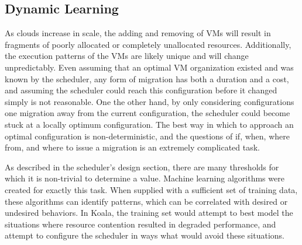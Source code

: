 %
%
%
\subsection{Dynamic Learning}
As clouds increase in scale, the adding and removing of VMs will result in fragments of poorly allocated or completely unallocated resources.  Additionally, the execution patterns of the VMs are likely unique and will change unpredictably.  Even assuming that an optimal VM organization existed and was known by the scheduler, any form of migration has both a duration and a cost, and assuming the scheduler could reach this configuration before it changed simply is not reasonable.  One the other hand, by only considering configurations one migration away from the current configuration, the scheduler could become stuck at a locally optimum configuration.  The best way in which to approach an optimal configuration is non-deterministic, and the questions of if, when, where from, and where to issue a migration is an extremely complicated task.  

As described in the scheduler's design section, there are many thresholds for which it is non-trivial to determine a value.  Machine learning algorithms were created for exactly this task.  When supplied with a sufficient set of training data, these algorithms can identify patterns, which can be correlated with desired or undesired behaviors.  In Koala, the training set would attempt to best model the situations where resource contention resulted in degraded performance, and attempt to configure the scheduler in ways what would avoid these situations.



